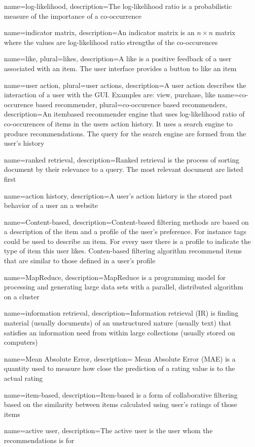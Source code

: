 {
name={log-likelihood},
description={The log-likelihood ratio is a probabilistic measure of the importance of a co-occurrence}
}

{
name={indicator matrix},
description={An indicator matrix is an $n \times n$ matrix where the values are log-likelihood ratio strengths of the co-occurences}
}

{
name={like},
plural={likes},
description={A like is a positive feedback of a user associated with an item. The user interface provides a button to like an item}
}

{
name={user action},
plural={user actions},
description={A user action describes the interaction of a user with the GUI. Examples are: view, purchase, like }
}
{
name={co-occurence based recommender},
plural={co-occurence based recommenders},
description={An itembased recommender engine that uses log-likelihood ratio of co-occurences of items in the users action history. It uses a search engine to produce recommendations. The query for the search engine are formed from the user's history }
}

{
name={ranked retrieval},
description={Ranked retrieval is the process of sorting document by their relevance to a query. The most relevant document are listed first}
}

{
name={action history},
description={A user's action history is the stored past behavior of a user an a website}
}

{
name={Content-based},
description={Content-based filtering methods are based on a description of the item and a profile of the user’s preference. For instance tags could be used to describe an item. For every user there is a profile to indicate the type of item this user likes. Conten-based filtering algorithm recommend items that are similar to those defined in a user's profile}
}

{
name={MapReduce},
description={MapReduce is a programming model for processing and generating large data sets with a parallel, distributed algorithm on a cluster}
}

{
name={information retrieval},
description={Information retrieval (IR) is finding material (usually documents) of an
unstructured nature (usually text) that satisfies an information need from
within large collections (usually stored on computers) \cite{Manning}
}
}

{
name={Mean Absolute Error},
description={ Mean Absolute Error (MAE) is a quantity used to measure how close the prediction of a rating value is to the actual rating}
}

{
name={item-based},
description={Item-based is a form of collaborative filtering based on the similarity between items calculated using user's ratings of those items \cite{jannach}
}
}

{
name={active user},
description={The active user is the user whom the recommendations is for}
}
